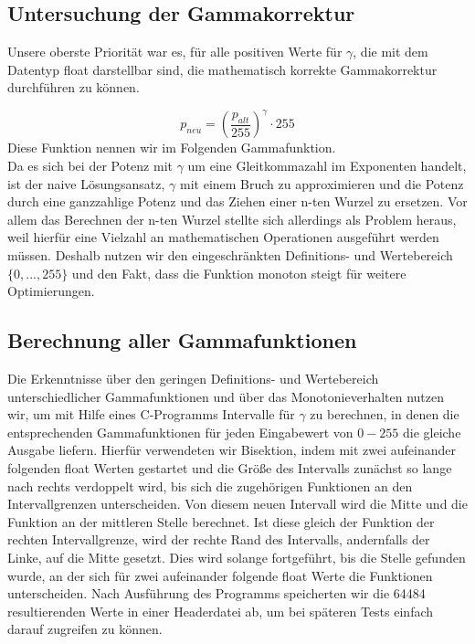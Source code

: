\documentclass[course=erap]{aspdoc}
\begin{document}
	
	\subsection{Untersuchung der Gammakorrektur}
	Unsere oberste Priorität war es, für alle positiven Werte für $\gamma$, die mit dem Datentyp float darstellbar sind, die mathematisch korrekte Gammakorrektur durchführen zu können.
	
	\begin{equation}
	\label{(3)}
	p_{neu} = \left(\frac{p_{alt}}{255}\right)^{\gamma} \cdot 255
	\end{equation}   
	Diese Funktion nennen wir im Folgenden Gammafunktion.\\
	
	\noindent Da es sich bei der Potenz mit $\gamma$ um eine Gleitkommazahl im Exponenten handelt, ist der naive Lösungsansatz, $\gamma$ mit einem Bruch zu approximieren und die Potenz durch eine ganzzahlige Potenz und das Ziehen einer n-ten Wurzel zu ersetzen.
	Vor allem das Berechnen der n-ten Wurzel stellte sich allerdings als Problem heraus, weil hierfür eine Vielzahl an mathematischen Operationen ausgeführt werden müssen. Deshalb nutzen wir den eingeschränkten Definitions- und Wertebereich $\{0,...,255\}$ und den Fakt, dass die Funktion monoton steigt für weitere Optimierungen.
	
	\subsection{Berechnung aller Gammafunktionen}
	Die Erkenntnisse über den geringen Definitions- und Wertebereich unterschiedlicher Gammafunktionen und über das Monotonieverhalten nutzen wir, um mit Hilfe eines C-Programms Intervalle für $\gamma$ zu berechnen, in denen die entsprechenden Gammafunktionen für jeden Eingabewert von $0-255$ die gleiche Ausgabe liefern. Hierfür verwendeten wir Bisektion, indem mit zwei aufeinander folgenden float Werten gestartet und die Größe des Intervalls zunächst so lange nach rechts verdoppelt wird, bis sich die zugehörigen Funktionen an den Intervallgrenzen unterscheiden. Von diesem neuen Intervall wird die Mitte und die Funktion an der mittleren Stelle berechnet. Ist diese gleich der Funktion der rechten Intervallgrenze, wird der rechte Rand des Intervalls, andernfalls der Linke, auf die Mitte gesetzt. Dies wird solange fortgeführt, bis die Stelle gefunden wurde, an der sich für zwei aufeinander folgende float Werte die Funktionen unterscheiden. Nach Ausführung des Programms speicherten wir die 64484 resultierenden Werte in einer Headerdatei ab, um bei späteren Tests einfach darauf zugreifen zu können.
	
\end{document}
